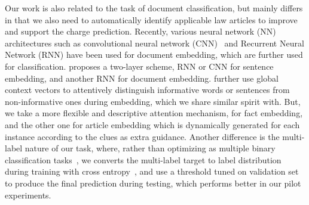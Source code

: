 Our work is also related to the task of document classification, but mainly differs in that we also need to automatically identify applicable law articles to improve and support the charge prediction.
Recently, various neural network (NN) architectures such as convolutional neural network (CNN)~\cite{kim2014convolutional} and Recurrent Neural Network (RNN) have been used for document embedding, which are further used for classification.
\cite{tang2015document} proposes a two-layer scheme, RNN or CNN for sentence embedding, and another RNN for document embedding.
\cite{yang2016hierarchical} further use global context vectors to attentively distinguish informative words or sentences from non-informative ones during embedding, which we share similar spirit with. 
But, we take a more flexible and descriptive  attention mechanism,  for fact embedding, and the other one for article embedding which is  dynamically generated for each instance according to the  clues as extra guidance.
%
Another difference is the multi-label nature of our task, where, rather than optimizing as multiple binary classification tasks~\cite{nam2014large}, 
we converts the multi-label target to label distribution during training with cross entropy~\cite{kurata2016improved}, and use a threshold tuned on validation set to produce the final prediction during testing, which performs better  in our pilot experiments.
